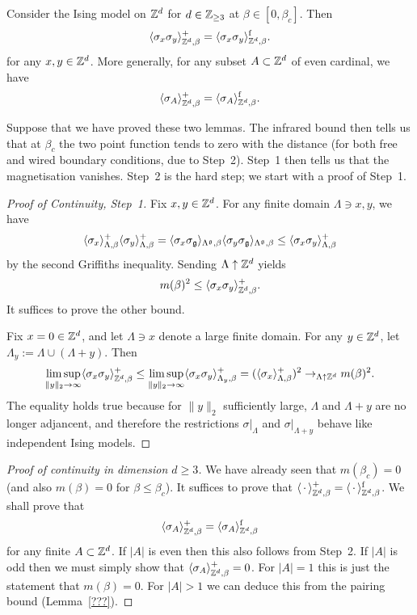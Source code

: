 \begin{lemma}
    Consider the Ising model on $\mathbb Z^d$ for $d\in\mathbb Z_{\geq 3}$ at $\beta\in[0,\beta_c]$.
    Then
    \[
        \langle\sigma_x\sigma_y\rangle_{\mathbb Z^d,\beta}^+
        =
        \langle\sigma_x\sigma_y\rangle_{\mathbb Z^d,\beta}^{\operatorname{f}}.
    \]
    for any $x,y\in\mathbb Z^d$.
    More generally, for any subset $A\subset\mathbb Z^d$ of even cardinal, we have 
    \[
        \langle\sigma_A\rangle_{\mathbb Z^d,\beta}^+
        =
        \langle\sigma_A\rangle_{\mathbb Z^d,\beta}^{\operatorname{f}}.
    \]
\end{lemma}

Suppose that we have proved these two lemmas.
The infrared bound then tells us that at $\beta_c$ the two point function tends
to zero with the distance (for both free and wired boundary conditions, due to Step~2).
Step~1 then tells us that the magnetisation vanishes.
Step~2 is the hard step; we start with a proof of Step~1.

\begin{proof}[Proof of Continuity, Step~1]
    Fix $x,y\in\mathbb Z^d$.
    For any finite domain $\Lambda\ni x,y$,
    we have
    \[
        \langle\sigma_x\rangle_{\Lambda,\beta}^+
        \langle\sigma_y\rangle_{\Lambda,\beta}^+
        =
        \langle\sigma_x\sigma_\mathfrak g\rangle_{\Lambda^\mathfrak g,\beta}
        \langle\sigma_y\sigma_\mathfrak g\rangle_{\Lambda^\mathfrak g,\beta}
        \leq
        \langle\sigma_x\sigma_y\rangle_{\Lambda,\beta}^+
    \]
    by the second Griffiths inequality.
    Sending $\Lambda\uparrow\mathbb Z^d$ yields
    \[
        m(\beta)^2\leq \langle\sigma_x\sigma_y\rangle_{\mathbb Z^d,\beta}^+.
    \]
    It suffices to prove the other bound.

    Fix $x=0\in\mathbb Z^d$, and let $\Lambda\ni x$ denote a large finite domain.
    For any $y\in\mathbb Z^d$, let $\Lambda_y:=\Lambda\cup(\Lambda+y)$.
    Then
    \[
        \limsup_{\|y\|_2\to\infty}\langle\sigma_x\sigma_y\rangle_{\mathbb Z^d,\beta}^+
        \leq
        \limsup_{\|y\|_2\to\infty}\langle\sigma_x\sigma_y\rangle_{\Lambda_y,\beta}^+
        =
        (\langle\sigma_x\rangle_{\Lambda,\beta}^+)^2
        \to_{\Lambda\uparrow\mathbb Z^d}m(\beta)^2.
    \]
    The equality holds true because for $\|y\|_2$ sufficiently large,
    $\Lambda$ and $\Lambda+y$ are no longer adjancent,
    and therefore the restrictions $\sigma|_\Lambda$
    and $\sigma|_{\Lambda+y}$ behave like independent Ising models.
\end{proof}



\begin{proof}[Proof of continuity in dimension $d\geq 3$]
    We have already seen that $m(\beta_c)=0$
    (and also $m(\beta)=0$ for $\beta\leq\beta_c$).
    It suffices to prove that $\langle\,\cdot\,\rangle^+_{\mathbb Z^d,\beta}=\langle\,\cdot\,\rangle^{\operatorname{f}}_{\mathbb Z^d,\beta}$.
    We shall prove that
    \[
        \langle\sigma_A\rangle^+_{\mathbb Z^d,\beta}=\langle\sigma_A\rangle^{\operatorname{f}}_{\mathbb Z^d,\beta}
    \]
    for any finite $A\subset\mathbb Z^d$.
    If $|A|$ is even then this also follows from Step~2.
    If $|A|$ is odd then we must simply show that $\langle\sigma_A\rangle^+_{\mathbb Z^d,\beta}=0$.
    For $|A|=1$ this is just the statement that $m(\beta)=0$.
    For $|A|>1$ we can deduce this from the pairing bound (Lemma~\ref{???}).
\end{proof}
